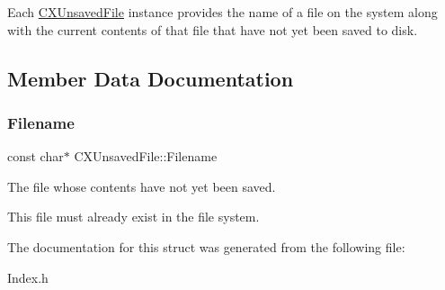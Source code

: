 Each \mbox{\hyperlink{structCXUnsavedFile}{C\+X\+Unsaved\+File}} instance provides the name of a file on the system along with the current contents of that file that have not yet been saved to disk. 

\subsection{Member Data Documentation}
\mbox{\label{structCXUnsavedFile_aa8bf5d4351628ee8502b517421e8b418}} 
\subsubsection{\texorpdfstring{Filename}{Filename}}
{\footnotesize\ttfamily const char$\ast$ C\+X\+Unsaved\+File\+::\+Filename}



The file whose contents have not yet been saved. 

This file must already exist in the file system. 

The documentation for this struct was generated from the following file\+:\begin{DoxyCompactItemize}
\item 
Index.\+h\end{DoxyCompactItemize}

